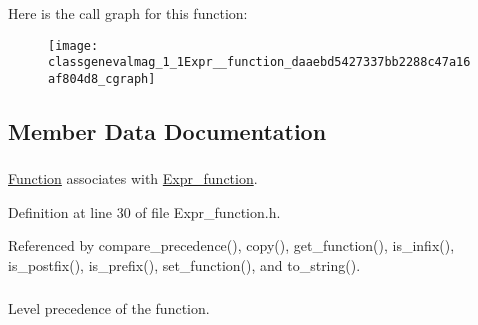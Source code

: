 Here is the call graph for this function:\nopagebreak
\begin{figure}[H]
\begin{center}
\leavevmode
\texttt{[image: classgenevalmag\_1\_1Expr\_\_function\_daaebd5427337bb2288c47a16af804d8\_cgraph]}
\end{center}
\end{figure}


\subsection{Member Data Documentation}
\hypertarget{classgenevalmag_1_1Expr__function_8248bebb1840bf2d2fcb2e818ba5a3eb}{
\subsubsection[{func}]{}}
\label{classgenevalmag_1_1Expr__function_8248bebb1840bf2d2fcb2e818ba5a3eb}


\hyperlink{classgenevalmag_1_1Function}{Function} associates with \hyperlink{classgenevalmag_1_1Expr__function}{Expr\_\-function}. 



Definition at line 30 of file Expr\_\-function.h.

Referenced by compare\_\-precedence(), copy(), get\_\-function(), is\_\-infix(), is\_\-postfix(), is\_\-prefix(), set\_\-function(), and to\_\-string().\hypertarget{classgenevalmag_1_1Expr__function_98a74d7ae5aaeb4b0d69c79845f8ce8f}{
\subsubsection[{precedence\_\-level}]{}}
\label{classgenevalmag_1_1Expr__function_98a74d7ae5aaeb4b0d69c79845f8ce8f}


Level precedence of the function. 



